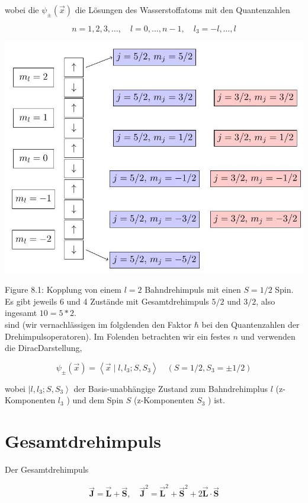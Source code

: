 \documentclass[10pt, letterpaper]{article}
\begin{document}
wobei die $\psi_{ \pm}(\vec{x})$ die Lösungen des Wasserstoffatoms mit den Quantenzahlen

$$
n=1,2,3, \ldots, \quad l=0, \ldots, n-1, \quad l_{3}=-l, \ldots, l
$$

\begin{center}
\includegraphics[max width=\textwidth]{2025_06_07_dbb046f06838039593f3g-09}
\end{center}

Figure 8.1: Kopplung von einem $l=2$ Bahndrehimpuls mit einen $S=1 / 2$ Spin. Es gibt jeweils 6 und 4 Zustände mit Gesamtdrehimpuls $5 / 2$ und $3 / 2$, also ingesamt $10=5 * 2$.\\
sind (wir vernachlässigen im folgdenden den Faktor $\hbar$ bei den Quantenzahlen der Drehimpulsoperatoren). Im Folenden betrachten wir ein festes $n$ und verwenden die DiracDarstellung,

$$
\psi_{ \pm}(\vec{x})=\left\langle\vec{x} \mid l, l_{3} ; S, S_{3}\right\rangle \quad\left(S=1 / 2, S_{3}= \pm 1 / 2\right)
$$

wobei $\left|l, l_{3} ; S, S_{3}\right\rangle$ der Basis-unabhängige Zustand zum Bahndrehimplus $l$ (z-Komponenten $l_{3}$ ) und dem Spin $S$ (z-Komponenten $S_{3}$ ) ist.

\section*{Gesamtdrehimpuls}
Der Gesamtdrehimpuls

$$
\overrightarrow{\mathbf{J}}=\overrightarrow{\mathbf{L}}+\overrightarrow{\mathbf{S}}, \quad \overrightarrow{\mathbf{J}}^{2}=\overrightarrow{\mathbf{L}}^{2}+\overrightarrow{\mathbf{S}}^{2}+2 \overrightarrow{\mathbf{L}} \cdot \overrightarrow{\mathbf{S}}
$$
\end{document}
